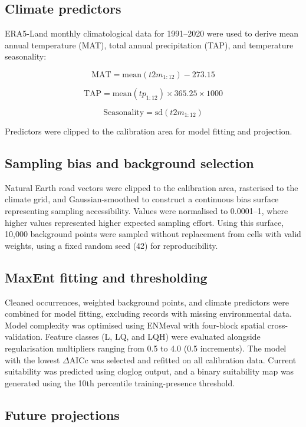 \subsection{Climate predictors}

ERA5-Land monthly climatological data for 1991--2020 were used to derive mean annual temperature (MAT), total annual precipitation (TAP), and temperature seasonality:

$$
\text{MAT} = \text{mean}(t2m_{1:12}) - 273.15
$$

$$
\text{TAP} = \text{mean}(tp_{1:12}) \times 365.25 \times 1000
$$

$$
\text{Seasonality} = \text{sd}(t2m_{1:12})
$$

Predictors were clipped to the calibration area for model fitting and projection.

\subsection{Sampling bias and background selection}

Natural Earth road vectors were clipped to the calibration area, rasterised to the climate grid, and Gaussian-smoothed to construct a continuous bias surface representing sampling accessibility. Values were normalised to 0.0001--1, where higher values represented higher expected sampling effort. Using this surface, 10{,}000 background points were sampled without replacement from cells with valid weights, using a fixed random seed (42) for reproducibility.

\subsection{MaxEnt fitting and thresholding}

Cleaned occurrences, weighted background points, and climate predictors were combined for model fitting, excluding records with missing environmental data. Model complexity was optimised using ENMeval with four-block spatial cross-validation. Feature classes (L, LQ, and LQH) were evaluated alongside regularisation multipliers ranging from 0.5 to 4.0 (0.5 increments). The model with the lowest $\Delta\text{AICc}$ was selected and refitted on all calibration data. Current suitability was predicted using cloglog output, and a binary suitability map was generated using the 10th percentile training-presence threshold.

\subsection{Future projections}

